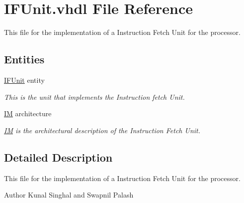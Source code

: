 \hypertarget{_i_f_unit_8vhdl}{\section{I\-F\-Unit.\-vhdl File Reference}
\label{_i_f_unit_8vhdl}
}


This file for the implementation of a Instruction Fetch Unit for the processor.  


\subsection*{Entities}
\begin{DoxyCompactItemize}
\item 
\hyperlink{class_i_f_unit}{I\-F\-Unit} entity
\begin{DoxyCompactList}\small\item\em This is the unit that implements the Instruction fetch Unit. \end{DoxyCompactList}\item 
\hyperlink{class_i_f_unit_1_1_i_m}{I\-M} architecture
\begin{DoxyCompactList}\small\item\em \hyperlink{class_i_f_unit_1_1_i_m}{I\-M} is the architectural description of the Instruction Fetch Unit. \end{DoxyCompactList}\end{DoxyCompactItemize}


\subsection{Detailed Description}
This file for the implementation of a Instruction Fetch Unit for the processor. \begin{DoxyAuthor}{Author}
Kunal Singhal and Swapnil Palash 
\end{DoxyAuthor}
